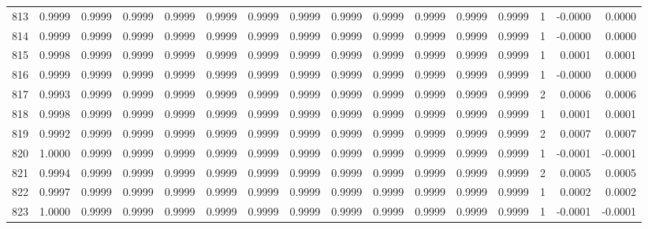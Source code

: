 \begin{tabular}{lrrrrrrrrrrrrrrr}
813 &      0.9999 &  0.9999 &  0.9999 &  0.9999 &  0.9999 &  0.9999 &  0.9999 &  0.9999 &  0.9999 &  0.9999 &   0.9999 &     0.9999 &      1 &                   -0.0000 &                     0.0000 \\
814 &      0.9999 &  0.9999 &  0.9999 &  0.9999 &  0.9999 &  0.9999 &  0.9999 &  0.9999 &  0.9999 &  0.9999 &   0.9999 &     0.9999 &      1 &                   -0.0000 &                     0.0000 \\
815 &      0.9998 &  0.9999 &  0.9999 &  0.9999 &  0.9999 &  0.9999 &  0.9999 &  0.9999 &  0.9999 &  0.9999 &   0.9999 &     0.9999 &      1 &                    0.0001 &                     0.0001 \\
816 &      0.9999 &  0.9999 &  0.9999 &  0.9999 &  0.9999 &  0.9999 &  0.9999 &  0.9999 &  0.9999 &  0.9999 &   0.9999 &     0.9999 &      1 &                   -0.0000 &                     0.0000 \\
817 &      0.9993 &  0.9999 &  0.9999 &  0.9999 &  0.9999 &  0.9999 &  0.9999 &  0.9999 &  0.9999 &  0.9999 &   0.9999 &     0.9999 &      2 &                    0.0006 &                     0.0006 \\
818 &      0.9998 &  0.9999 &  0.9999 &  0.9999 &  0.9999 &  0.9999 &  0.9999 &  0.9999 &  0.9999 &  0.9999 &   0.9999 &     0.9999 &      1 &                    0.0001 &                     0.0001 \\
819 &      0.9992 &  0.9999 &  0.9999 &  0.9999 &  0.9999 &  0.9999 &  0.9999 &  0.9999 &  0.9999 &  0.9999 &   0.9999 &     0.9999 &      2 &                    0.0007 &                     0.0007 \\
820 &      1.0000 &  0.9999 &  0.9999 &  0.9999 &  0.9999 &  0.9999 &  0.9999 &  0.9999 &  0.9999 &  0.9999 &   0.9999 &     0.9999 &      1 &                   -0.0001 &                    -0.0001 \\
821 &      0.9994 &  0.9999 &  0.9999 &  0.9999 &  0.9999 &  0.9999 &  0.9999 &  0.9999 &  0.9999 &  0.9999 &   0.9999 &     0.9999 &      2 &                    0.0005 &                     0.0005 \\
822 &      0.9997 &  0.9999 &  0.9999 &  0.9999 &  0.9999 &  0.9999 &  0.9999 &  0.9999 &  0.9999 &  0.9999 &   0.9999 &     0.9999 &      1 &                    0.0002 &                     0.0002 \\
823 &      1.0000 &  0.9999 &  0.9999 &  0.9999 &  0.9999 &  0.9999 &  0.9999 &  0.9999 &  0.9999 &  0.9999 &   0.9999 &     0.9999 &      1 &                   -0.0001 &                    -0.0001 \\

\end{tabular}
